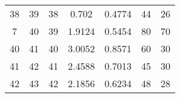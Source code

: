 \begin{table}
\begin{adjustbox}{width=1.2\textwidth,center=\textwidth}
\begin{tabular}{ccccccc}
38                                                        & 39                                                          & 38                                                  & 0.702                                                                      & 0.4774                                                                    & 44                                                                          & 26                                                                               \\
7                                                         & 40                                                          & 39                                                  & 1.9124                                                                     & 0.5454                                                                    & 80                                                                          & 70                                                                               \\
40                                                        & 41                                                          & 40                                                  & 3.0052                                                                     & 0.8571                                                                    & 60                                                                          & 30                                                                               \\
41                                                        & 42                                                          & 41                                                  & 2.4588                                                                     & 0.7013                                                                    & 45                                                                          & 30                                                                               \\
42                                                        & 43                                                          & 42                                                  & 2.1856                                                                     & 0.6234                                                                    & 48                                                                          & 28                                                                               \\

\end{tabular}
\end{adjustbox}
\end{table}
